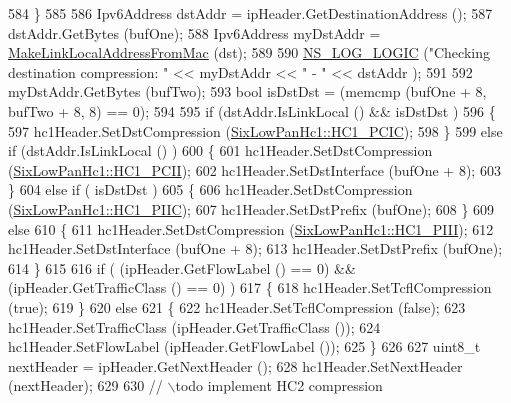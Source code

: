 \begin{DoxyCode}
584         \}
585 
586       Ipv6Address dstAddr = ipHeader.GetDestinationAddress ();
587       dstAddr.GetBytes (bufOne);
588       Ipv6Address myDstAddr = \hyperlink{classns3_1_1SixLowPanNetDevice_acf66b0ff019d0f1b88212d452044696e}{MakeLinkLocalAddressFromMac} (dst);
589 
590       \hyperlink{group__logging_ga88acd260151caf2db9c0fc84997f45ce}{NS\_LOG\_LOGIC} (\textcolor{stringliteral}{"Checking destination compression: "} << myDstAddr << \textcolor{stringliteral}{" - "} << dstAddr );
591 
592       myDstAddr.GetBytes (bufTwo);
593       \textcolor{keywordtype}{bool} isDstDst = (memcmp (bufOne + 8, bufTwo + 8, 8) == 0);
594 
595       \textcolor{keywordflow}{if} (dstAddr.IsLinkLocal () && isDstDst )
596         \{
597           hc1Header.SetDstCompression (\hyperlink{classns3_1_1SixLowPanHc1_a29c864d9bf6bc466ee2214a95a83dcada2e3b9656c8f4d8912d0bf078533e298f}{SixLowPanHc1::HC1\_PCIC});
598         \}
599       \textcolor{keywordflow}{else} \textcolor{keywordflow}{if} (dstAddr.IsLinkLocal () )
600         \{
601           hc1Header.SetDstCompression (\hyperlink{classns3_1_1SixLowPanHc1_a29c864d9bf6bc466ee2214a95a83dcada3b9d64b07cd392302c87ed69164f0793}{SixLowPanHc1::HC1\_PCII});
602           hc1Header.SetDstInterface (bufOne + 8);
603         \}
604       \textcolor{keywordflow}{else} \textcolor{keywordflow}{if} ( isDstDst )
605         \{
606           hc1Header.SetDstCompression (\hyperlink{classns3_1_1SixLowPanHc1_a29c864d9bf6bc466ee2214a95a83dcada8e07a41c91e304c47d01515d51d399ca}{SixLowPanHc1::HC1\_PIIC});
607           hc1Header.SetDstPrefix (bufOne);
608         \}
609       \textcolor{keywordflow}{else}
610         \{
611           hc1Header.SetDstCompression (\hyperlink{classns3_1_1SixLowPanHc1_a29c864d9bf6bc466ee2214a95a83dcada33fbbb35ed064759434a773a85d2d325}{SixLowPanHc1::HC1\_PIII});
612           hc1Header.SetDstInterface (bufOne + 8);
613           hc1Header.SetDstPrefix (bufOne);
614         \}
615 
616       \textcolor{keywordflow}{if} ( (ipHeader.GetFlowLabel () == 0) && (ipHeader.GetTrafficClass () == 0) )
617         \{
618           hc1Header.SetTcflCompression (\textcolor{keyword}{true});
619         \}
620       \textcolor{keywordflow}{else}
621         \{
622           hc1Header.SetTcflCompression (\textcolor{keyword}{false});
623           hc1Header.SetTrafficClass (ipHeader.GetTrafficClass ());
624           hc1Header.SetFlowLabel (ipHeader.GetFlowLabel ());
625         \}
626 
627       uint8\_t nextHeader = ipHeader.GetNextHeader ();
628       hc1Header.SetNextHeader (nextHeader);
629 
630       \textcolor{comment}{// \(\backslash\)todo implement HC2 compression}

\end{DoxyCode}
